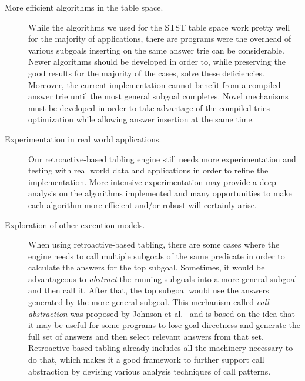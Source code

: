 \begin{description}
   
   \item[More efficient algorithms in the table space.] While the algorithms we used for the STST table space
   work pretty well for the majority of applications, there are programs were the overhead of various
   subgoals inserting on the same answer trie can be considerable. Newer algorithms should be developed in order to,
   while preserving the good results for the majority of the cases, solve these deficiencies. Moreover,
   the current implementation cannot benefit from a compiled answer trie until the most general subgoal completes.
   Novel mechanisms must be developed in order to take advantage of the compiled tries optimization while
   allowing answer insertion at the same time.
   
   \item[Experimentation in real world applications.] Our retroactive-based tabling engine still needs more
   experimentation and testing with real world data and applications in order to refine the implementation.
   More intensive experimentation may provide a deep analysis on the algorithms implemented and many opportunities
   to make each algorithm more efficient and/or robust will certainly arise.
   
   \item[Exploration of other execution models.] When using retroactive-based tabling, there are some cases where the
   engine needs to call multiple subgoals of the same predicate in order to calculate the answers for the top subgoal.
   Sometimes, it would be advantageous to \emph{abstract} the running subgoals into a more general subgoal and then
   call it. After that, the top subgoal would use the answers generated by the more general subgoal. This mechanism
   called \emph{call abstraction} was proposed by Johnson et al.~\cite{Johnson-99} and is based on the idea that it
   may be useful for some programs to lose goal directness and generate the full set of answers and then select relevant
   answers from that set. Retroactive-based tabling already includes all the machinery necessary to do that, which makes
   it a good framework to further support call abstraction by devising various analysis techniques of call patterns.
   
\end{description}